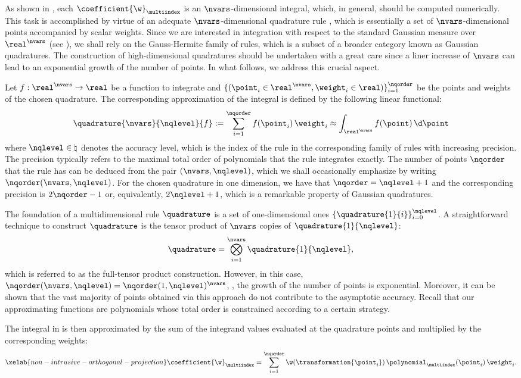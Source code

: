 As shown in , each $\coefficient{\w}_{\multiindex}$ is an $\nvars$-dimensional integral, which, in general, should be computed numerically.
This task is accomplished by virtue of an adequate $\nvars$-dimensional quadrature rule \cite{press2007}, which is essentially a set of $\nvars$-dimensional points accompanied by scalar weights.
Since we are interested in integration with respect to the standard Gaussian measure over $\real^\nvars$ (see ), we shall rely on the Gauss-Hermite family of rules, which is a subset of a broader category known as Gaussian quadratures.
The construction of high-dimensional quadratures should be undertaken with a great care since a liner increase of $\nvars$ can lead to an exponential growth of the number of points.
In what follows, we address this crucial aspect.

Let $f: \real^\nvars \to \real$ be a function to integrate and $\{ (\point_i \in \real^\nvars, \weight_i \in \real) \}_{i = 1}^\nqorder$ be the points and weights of the chosen quadrature.
The corresponding approximation of the integral is defined by the following linear functional:
\[
  \quadrature{\nvars}{\nqlevel}{f} := \sum_{i = 1}^\nqorder f(\point_i) \, \weight_i \approx \int_{\real^\nvars} f(\point) \, \d \point
\]
where $\nqlevel \in \natural$ denotes the accuracy level, which is the index of the rule in the corresponding family of rules with increasing precision.
The precision typically refers to the maximal total order of polynomials that the rule integrates exactly.
The number of points $\nqorder$ that the rule has can be deduced from the pair $(\nvars, \nqlevel)$, which we shall occasionally emphasize by writing $\nqorder(\nvars, \nqlevel)$.
For the chosen quadrature in one dimension, we have that $\nqorder = \nqlevel + 1$ and the corresponding precision is $2 \nqorder - 1$ or, equivalently, $2 \nqlevel + 1$, which is a remarkable property of Gaussian quadratures.

The foundation of a multidimensional rule $\quadrature$ is a set of one-dimensional ones $\{ \quadrature{1}{i} \}_{i = 0}^\nqlevel$.
A straightforward technique to construct $\quadrature$ is the tensor product of $\nvars$ copies of $\quadrature{1}{\nqlevel}$:
\[
  \quadrature = \bigotimes_{i = 1}^\nvars \quadrature{1}{\nqlevel},
\]
which is referred to as the full-tensor product construction.
However, in this case, $\nqorder(\nvars, \nqlevel) = \nqorder(1, \nqlevel)^\nvars$, \ie, the growth of the number of points is exponential.
Moreover, it can be shown that the vast majority of points obtained via this approach do not contribute to the asymptotic accuracy.
Recall that our approximating functions are polynomials whose total order is constrained according to a certain strategy.

The integral in  is then approximated by the sum of the integrand values evaluated at the quadrature points and multiplied by the corresponding weights:
\begin{equation} \xelab{non-intrusive-orthogonal-projection}
  \coefficient{\w}_{\multiindex} = \sum_{i = 1}^\nqorder \w(\transformation{\point_i}) \, \polynomial_{\multiindex}(\point_i) \, \weight_i.
\end{equation}
